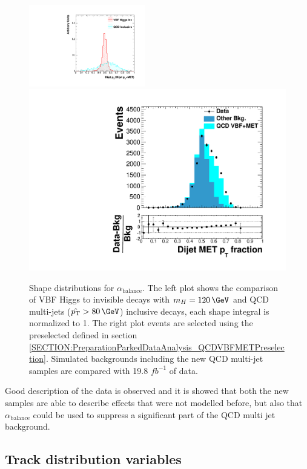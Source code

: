 \begin{figure}[!htb]
\centering
\includegraphics[width=0.45\textwidth]{Chapter06/TopologicalVariables/Images/JetPair_dijetOverMetPt.pdf} 
\includegraphics[width=0.45\linewidth]{Chapter06/QCD_VBFMET_Samples/PreSelection/Images//DEta3p6_MetSig3p0_MinDPhiJetsMet1p5/dijetmet_ptfraction.pdf}
\caption{Shape distributions for $\alpha_{\text{balance}}$. The left plot shows the comparison of \gls{VBF} Higgs to invisible decays with $m_H=120\,\GeV$ and \gls{QCD} multi-jets ($\hat{\pt}>80\,\GeV$) inclusive decays, each shape integral is normalized to 1. The right plot events are selected using the preselected defined in section \ref{SECTION:PreparationParkedDataAnalysis_QCDVBFMETPreselection}. Simulated backgrounds including the new \gls{QCD} multi-jet samples are compared with 19.8 $fb^{-1}$ of data.}
\label{FIGURE:PreparationParkedDataAnalysis_DijetMETSystemVars_2}
\end{figure}

Good description of the data is observed and it is showed that both the new samples are able to describe effects that were not modelled before, but also that $\alpha_{\text{balance}}$ could be used to suppress a significant part of the \gls{QCD} multi jet background.

\subsection{Track distribution variables}
\label{SECTION:PreparationParkedDataAnalysis_TrackDistributionVariables}

